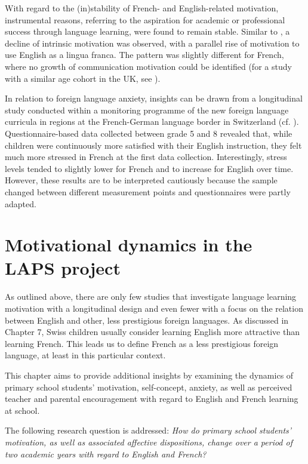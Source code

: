 \documentclass[output=paper]{langsci/langscibook}
\begin{document}
With regard to the (in)stability of French- and English-related motivation, instrumental reasons, referring to the aspiration for academic or professional success through language learning, were found to remain stable. Similar to \citet{Heinzmann2013}, a decline of intrinsic motivation was observed, with a parallel rise of motivation to use English as a lingua franca. The pattern was slightly different for French, where no growth of communication motivation could be identified (for a study with a similar age cohort in the UK, see \citealt{GrahamEtAl2016}).

In relation to foreign language anxiety, insights can be drawn from a longitudinal study conducted within a monitoring programme of the new foreign language curricula in regions at the French-German language border in Switzerland (cf. \citealt{SinghElmiger2017}). Questionnaire-based data collected between grade 5 and 8 revealed that, while children were continuously more satisfied with their English instruction, they felt much more stressed in French at the first data collection. Interestingly, stress levels tended to slightly lower for French and to increase for English over time. However, these results are to be interpreted cautiously because the sample changed between different measurement points and questionnaires were partly adapted.

\section{Motivational dynamics in the LAPS project}\label{sec:08:3}

As outlined above, there are only few studies that investigate language learning motivation with a longitudinal design and even fewer with a focus on the relation between English and other, less prestigious foreign languages. As discussed in Chapter 7, Swiss children usually consider learning English more attractive than learning French. This leads us to define French as a less prestigious foreign language, at least in this particular context.

This chapter aims to provide additional insights by examining the dynamics of primary school students’ motivation, self-concept, anxiety, as well as perceived teacher and parental encouragement with regard to English and French learning at school.

The following research question is addressed: \textit{How do primary school students’ motivation, as well as associated affective dispositions, change over a period of two academic years with regard to English and French?}
\end{document}
